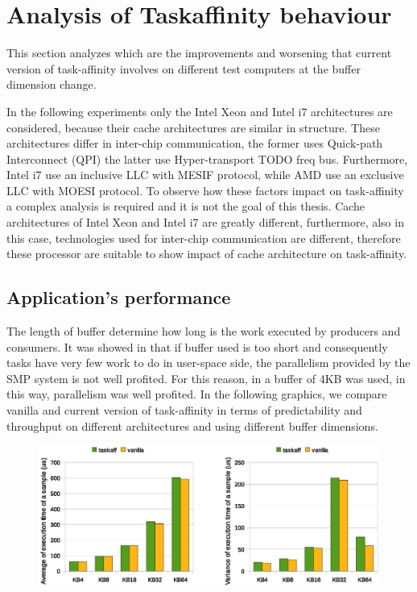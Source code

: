 \section{Analysis of Taskaffinity behaviour}

This section analyzes which are the improvements and worsening that current version of task-affinity involves on different test computers at the buffer 
dimension change.

In the following experiments only the Intel Xeon and Intel i7 architectures are
considered, because their cache architectures are similar in structure.
These architectures differ in inter-chip communication, the former uses Quick-path Interconnect (QPI) the latter use Hyper-transport TODO freq bus. 
Furthermore, Intel i7 use an inclusive LLC with MESIF protocol, while AMD use an exclusive LLC with MOESI protocol. To observe how these factors impact 
on task-affinity a complex analysis is required and it is not the goal of this thesis. Cache architectures of Intel Xeon and Intel i7 are greatly 
different, furthermore, also in this case, technologies used for inter-chip communication are different, therefore these processor are suitable to show 
impact of cache architecture on task-affinity.

\subsection{Application's performance}

The length of buffer determine how long is the work executed by producers and consumers. It was showed in \cite{lcs} that if buffer used is too short and 
consequently tasks have very few work to do in user-space side, the parallelism provided by the SMP system is not well profited. For this reason, in 
\cite{lcs} a buffer of 4KB was used, in this way, parallelism was well profited. In the following graphics, we compare vanilla and current version 
of task-affinity in terms of predictability and throughput on different architectures and using different buffer dimensions.

\begin{figure}[htbp]
\centering
\includegraphics[width=\widefigure]{images/time/time_avg_var_Xeon.eps}
\caption{}
\label{fig:avg_var_xeon}
\end{figure}

